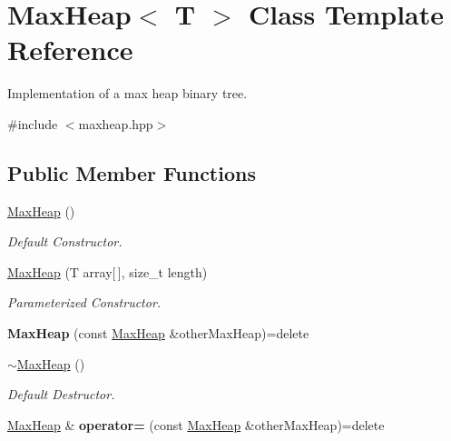 \hypertarget{class_max_heap}{}\section{Max\+Heap$<$ T $>$ Class Template Reference}
\label{class_max_heap}


Implementation of a max heap binary tree.  




{\ttfamily \#include $<$maxheap.\+hpp$>$}

\subsection*{Public Member Functions}
\begin{DoxyCompactItemize}
\item 
\hyperlink{class_max_heap_a699765b3f302e72791fe0de91c36aa39}{Max\+Heap} ()
\begin{DoxyCompactList}\small\item\em Default Constructor. \end{DoxyCompactList}\item 
\hyperlink{class_max_heap_a059ca3f1547c9695df3b2ed6b78ba762}{Max\+Heap} (T array\mbox{[}$\,$\mbox{]}, size\+\_\+t length)
\begin{DoxyCompactList}\small\item\em Parameterized Constructor. \end{DoxyCompactList}\item 
\mbox{\label{class_max_heap_a24cddc2c00ab5145d4073a8609583047}} 
{\bfseries Max\+Heap} (const \hyperlink{class_max_heap}{Max\+Heap} \&other\+Max\+Heap)=delete
\item 
\mbox{\label{class_max_heap_af7ad902a96540ba9f5947ef0fc7bfa80}} 
\hyperlink{class_max_heap_af7ad902a96540ba9f5947ef0fc7bfa80}{$\sim$\+Max\+Heap} ()
\begin{DoxyCompactList}\small\item\em Default Destructor. \end{DoxyCompactList}\item 
\mbox{\label{class_max_heap_afae77c1625c43b2319c0645e584b3dae}} 
\hyperlink{class_max_heap}{Max\+Heap} \& {\bfseries operator=} (const \hyperlink{class_max_heap}{Max\+Heap} \&other\+Max\+Heap)=delete
\item 

\end{DoxyCompactItemize}
